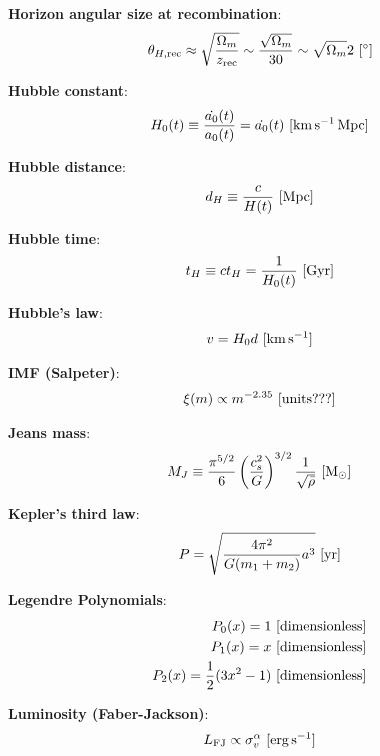 \documentclass[a4paper,11pt]{article}
\begin{document}
{\noindent}\textbf{Horizon angular size at recombination}:
\begin{align*}
    \theta_{H,\mathrm{rec}} \approx \sqrt{\frac{\Omega_m}{z_\mathrm{rec}}} \sim \frac{\sqrt{\Omega_m}}{30} \sim \sqrt{\Omega_m}2 ~ [{\rm ^\circ}]
\end{align*}

{\noindent}\textbf{Hubble constant}:
\begin{align*}
    H_0(t) \equiv \dfrac{\dot{a_0}(t)}{a_0(t)} = \dot{a_0}(t) ~ [{\rm km\,s^{-1}\,Mpc}]
\end{align*}

{\noindent}\textbf{Hubble distance}:
\begin{align*}
    d_H \equiv \frac{c}{H(t)} ~ [{\rm Mpc}]
\end{align*}

{\noindent}\textbf{Hubble time}:
\begin{align*}
    t_H \equiv ct_H = \frac{1}{H_0(t)} ~ [{\rm Gyr}]
\end{align*}

{\noindent}\textbf{Hubble's law}:
\begin{align*}
    v = H_0d ~ [{\rm km\,s^{-1}}]
\end{align*}

{\noindent}\textbf{IMF (Salpeter)}:
\begin{align*}
    \xi(m) \propto m^{-2.35} ~ [{\rm units???}]
\end{align*}

{\noindent}\textbf{Jeans mass}:
\begin{align*}
    M_J \equiv \frac{\pi^{5/2}}{6}\left(\frac{c_s^2}{G}\right)^{3/2}\frac{1}{\sqrt{\bar{\rho}}} ~ [{\rm M_\odot}]
\end{align*}

{\noindent}\textbf{Kepler's third law}:
\begin{align*}
    P = \sqrt{\frac{4\pi^2}{G(m_1+m_2)}a^3} ~ [{\rm yr}]
\end{align*}

{\noindent}\textbf{Legendre Polynomials}:
\begin{align*}
    P_0(x) = 1 ~ [{\rm dimensionless}] \\
    P_1(x) = x ~ [{\rm dimensionless}] \\
    P_2(x) = \frac{1}{2}(3x^2-1) ~ [{\rm dimensionless}]
\end{align*}

{\noindent}\textbf{Luminosity (Faber-Jackson)}:
\begin{align*}
    L_\mathrm{FJ} \propto \sigma_v^\alpha ~ [{\rm erg\,s^{-1}}]
\end{align*}
\end{document}
